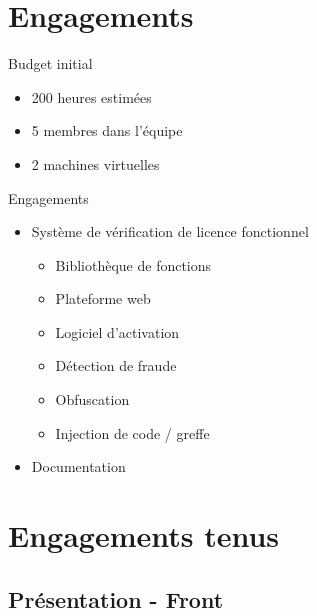 \documentclass{cubeamer}
\begin{document}
\section{Engagements}

\begin{frame}{Budget initial}
    \begin{itemize}
        \item 200 heures estimées
        \item 5 membres dans l'équipe
        \item 2 machines virtuelles
      \end{itemize}
\end{frame}

\begin{frame}{Engagements}
    \begin{itemize}
        \item Système de vérification de licence fonctionnel
        \begin{itemize}
        \item Bibliothèque de fonctions
        \item Plateforme web
        \item Logiciel d'activation
        \item Détection de fraude
        \item Obfuscation
        \item Injection de code / greffe 
        \end{itemize}
        \item Documentation
    \end{itemize}
\end{frame}

\section*{Engagements tenus}

\subsection{Présentation - Front}
\end{document}
